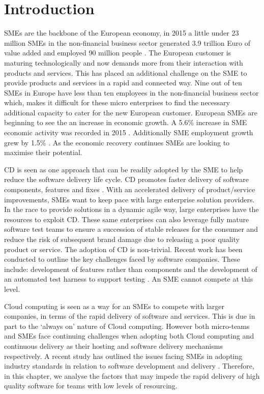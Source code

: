 \section{Introduction}

SMEs are the backbone of the European economy,  in 2015 a little under 23 million SMEs in the non-financial business sector generated 3.9 trillion Euro of value added and employed 90 million people \cite{europa2016sme}. The European customer is maturing technologically and now demands more from their interaction with products and services. This has placed an additional challenge on the SME to provide products and services in a rapid and connected way. Nine out of ten SMEs in Europe have less than ten employees \cite{eurocom2014sme} in the non-financial business sector which,  makes it difficult for these micro enterprises to find the necessary additional capacity to cater for the new European customer. European SMEs are beginning to see the an increase in economic growth. A 5.6\% increase in SME economic activity was recorded in 2015 \cite{europa2016sme}. Additionally SME employment growth grew by 1.5\% \cite{europa2016sme}. As the economic recovery continues SMEs are looking to maximise their potential. \par

CD is seen as one approach that can be readily adopted by the SME to help reduce the software delivery life cycle. CD promotes faster delivery of software components, features and fixes \cite{humble2010continuous}. With an accelerated delivery of product/service improvements, SMEs want to keep pace with large enterprise solution providers.  In the race to provide solutions in a dynamic agile way, large enterprises have the resources to exploit CD. These same enterprises can also leverage fully mature software test teams to ensure a succession of stable releases for the consumer and reduce the risk of subsequent brand damage due to releasing a poor quality product or service. The adoption of CD is non-trivial.  Recent work has been conducted to outline the key challenges faced by software companies. These include: development of features rather than components and the development of an automated test harness to support testing \cite{olsson2012climbing}. An SME cannot compete at this level. \par

Cloud computing is seen as a way for an SMEs to compete with larger companies, in terms of the rapid delivery of software and services. This is due in part to the `always on' nature of Cloud computing. However both micro-teams and SMEs face continuing challenges when adopting both Cloud computing and continuous delivery as their hosting and software delivery mechanisms respectively. A recent study has outlined the issues facing SMEs in adopting industry standards in relation to software development and delivery \cite{pusatli2011discussion}. Therefore, in this chapter, we analyse the factors that may impede the rapid delivery of high quality software for teams with low levels of resourcing. 

